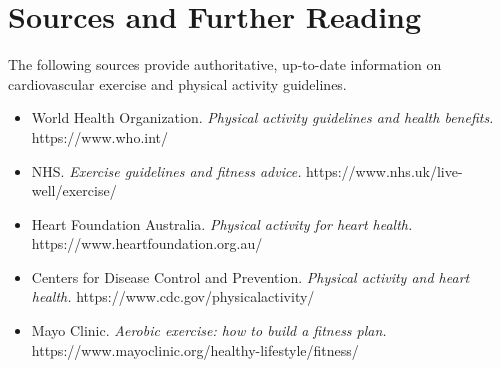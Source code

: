 \section*{Sources and Further Reading}
The following sources provide authoritative, up-to-date information on cardiovascular exercise and physical activity guidelines.
\begin{itemize}
    \item World Health Organization. \textit{Physical activity guidelines and health benefits.} https://www.who.int/
    \item NHS. \textit{Exercise guidelines and fitness advice.} https://www.nhs.uk/live-well/exercise/
    \item Heart Foundation Australia. \textit{Physical activity for heart health.} https://www.heartfoundation.org.au/
    \item Centers for Disease Control and Prevention. \textit{Physical activity and heart health.} https://www.cdc.gov/physicalactivity/
    \item Mayo Clinic. \textit{Aerobic exercise: how to build a fitness plan.} https://www.mayoclinic.org/healthy-lifestyle/fitness/
\end{itemize}

